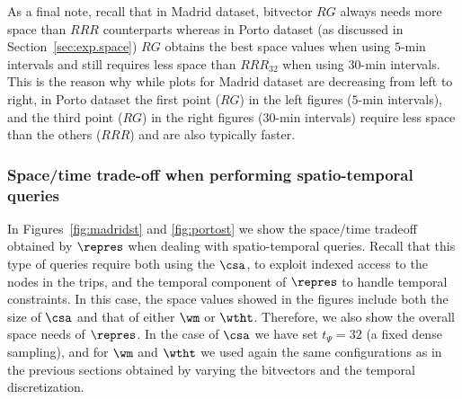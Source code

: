 As a final note, recall that in Madrid dataset, bitvector $RG$ always needs more space than $RRR$ counterparts 
whereas in Porto dataset (as discussed in Section~\ref{sec:exp.space})
$RG$ obtains the best space values when using $5$-min intervals and still requires less space than $RRR_{32}$ when using
$30$-min intervals. 
This is the reason why while plots for Madrid dataset are decreasing from left to right, in Porto
dataset the first point ($RG$) in the left figures ($5$-min intervals), and the third point ($RG$) 
in the right figures ($30$-min intervals) require less space than the others ($RRR$) and are also typically  faster. 


\subsubsection{Space/time trade-off when performing  spatio-temporal queries}

In Figures~\ref{fig:madridst} and \ref{fig:portost} we show the space/time tradeoff obtained by $\repres$ when 
dealing with spatio-temporal queries. Recall that this type of queries require both using the $\csa$, to 
exploit indexed access to the nodes in the trips, and the 
temporal component of $\repres$ to handle temporal constraints. In this case, the space values showed in
the figures include both the size of $\csa$ and that of either $\wm$ or $\wtht$. Therefore, we also show the
overall space needs of $\repres$. In the case of $\csa$ we
have set $t_{\Psi}=32$ (a fixed dense sampling), and for $\wm$ and $\wtht$ we used again the same 
configurations as in the previous sections obtained by varying the bitvectors and the temporal discretization. 


